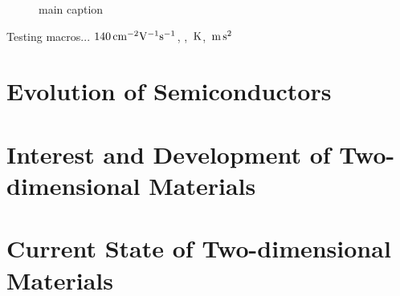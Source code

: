 \begin{figure}[ht]
	\centering
	\qquad

	\qquad
	\caption{main caption}
	\label{fig:figure}
\end{figure}

Testing macros... $140\,\mathrm{cm}^{-2}\mathrm{V}^{-1}\mathrm{s}^{-1}$, \hbn, $\,\mathrm{K}$, $\,\mathrm{m}\,\mathrm{s}^{2}$

\section{Evolution of Semiconductors}\label{sec:semicond_evolution}

\section{Interest and Development of Two-dimensional Materials}\label{sec:2D_development}

\section{Current State of Two-dimensional Materials}\label{sec:current_state}

